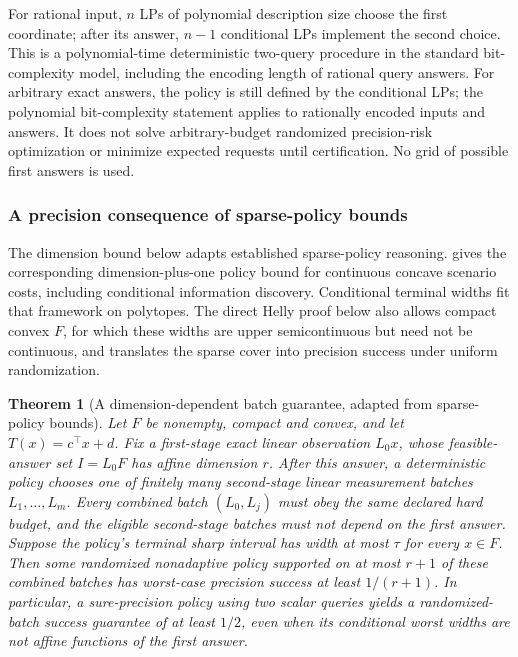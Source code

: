 \documentclass[12pt]{article}
\newtheorem{theorem}{Theorem}
\begin{document}
For rational input, $n$ LPs of polynomial description size choose the first
coordinate; after its answer, $n-1$ conditional LPs implement the second
choice. This is a polynomial-time deterministic two-query procedure in the
standard bit-complexity model, including the encoding length of rational
query answers. For arbitrary exact answers, the policy is still defined by
the conditional LPs; the polynomial bit-complexity statement applies to
rationally encoded inputs and answers. It does not solve arbitrary-budget
randomized precision-risk optimization or minimize expected requests until
certification. No grid of possible first answers is used.
\subsubsection{A precision consequence of sparse-policy bounds}
The dimension bound below adapts established sparse-policy reasoning.
\citet[Theorem~2 and Example~5]{kurtz2026} gives the corresponding
dimension-plus-one policy bound for continuous concave scenario costs,
including conditional information discovery. Conditional terminal widths
fit that framework on polytopes. The direct Helly proof below also allows
compact convex $F$, for which these widths are upper semicontinuous but
need not be continuous, and translates the sparse cover into precision
success under uniform randomization.
\begin{theorem}[A dimension-dependent batch guarantee, adapted from sparse-policy bounds]
\label{thm:helly-precision}
Let $F$ be nonempty, compact and convex, and let $T(x)=c^\top x+d$.
Fix a first-stage exact linear observation $L_0x$, whose feasible-answer
set $I=L_0F$ has affine dimension $r$. After this answer, a deterministic
policy chooses one of finitely many second-stage linear measurement
batches $L_1,\ldots,L_m$. Every combined batch $(L_0,L_j)$ must obey the
same declared hard budget, and the eligible second-stage batches must not
depend on the first answer. Suppose the policy's terminal sharp interval
has width at most $\tau$ for every $x\in F$.
Then some randomized nonadaptive policy supported on at most $r+1$
of these combined batches has worst-case precision success at least
$1/(r+1)$.
In particular, a sure-precision policy using two scalar queries yields
a randomized-batch success guarantee of at least $1/2$, even when its
conditional worst widths are not affine functions of the first answer.
\end{theorem}
\end{document}
